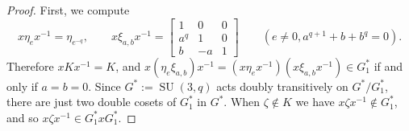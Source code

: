 \documentclass[11pt]{article}
\theoremstyle{definition}
\numberwithin{equation}{section}
\begin{document}
\begin{proof}
First, we compute
\begin{equation}
\label{eq:PSUrelx}
x \eta_e x^{-1}
=
\eta_{e^{-q}},
\qquad
x \xi_{a,b} x^{-1} = \begin{bmatrix} 1 & 0 & 0 \\ a^q & 1 & 0 \\ b & -a & 1 \end{bmatrix}
\qquad
(e \neq 0, a^{q+1} + b + b^q = 0).
\end{equation}
Therefore $xKx^{-1} = K$, and $x(\eta_e \xi_{a,b})x^{-1} = (x\eta_ex^{-1}) (x\xi_{a,b}x^{-1}) \in G_1^*$ if and only if $a=b=0$.
Since $G^* := \operatorname{SU}(3,q)$ acts doubly transitively on $G^*/G_1^*$, there are just two double cosets of $G_1^*$ in $G^*$.
When $\zeta \notin K$ we have $x \zeta x^{-1} \notin G_1^*$, and so $x \zeta x^{-1} \in G_1^* x G_1^*$.


\end{proof}
\end{document}
